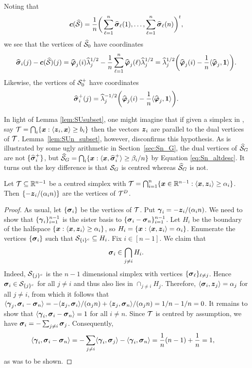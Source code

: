 Noting that 
\begin{equation*}
\vb*{c}(\widehat{\mathcal{S}}) = \frac{1}{n}\bigg(\sum_{\ell=1}^n \widehat{\vb*{\sigma}}_\ell(1),\dots,\sum_{\ell=1}^n \widehat{\vb*{\sigma}}_\ell(n)\bigg)^t,
\end{equation*}
we see that the vertices of $\widehat{\mathcal{S}}_0$ have coordinates
\begin{equation*}
\widehat{\vb*{\sigma}}_i(j) - \vb*{c}(\widehat{\mathcal{S}})(j) = \widehat{\vb*{\varphi}}_j(i)\widehat{\lambda}_j^{1/2} - \frac{1}{n}\sum_{\ell=1}^n \widehat{\vb*{\varphi}}_j(\ell)\widehat{\lambda}_j^{1/2} = \widehat{\lambda}_j^{1/2} \bigg(\widehat{\vb*{\varphi}}_j(i) - \frac{1}{n}\langle \widehat{\vb*{\varphi}}_j,\vb{1}\rangle \bigg).
\end{equation*}
Likewise, the vertices of $\mathcal{S}_0^+$ have coordinates 
\begin{equation*}
\widehat{\vb*{\sigma}}_i^+(j) = \widehat{\lambda}_j^{-1/2}\bigg(\widehat{\vb*{\varphi}}_j(i) - \frac{1}{n}\langle \widehat{\vb*{\varphi}}_j,\vb{1}\rangle\bigg).
\end{equation*}


In light of Lemma \ref{lem:SUsubset}, one might imagine that if given a simplex in \hdesc, say $\mathcal{T}=\bigcap_i \{\vb*{x}:\langle \vb*{z}_i,\vb*{x}\rangle \geq b_i\}$ then the vectors $\vb*{z}_i$ are parallel to the dual vertices of $\mathcal{T}$. Lemma~\ref{lem:SUn_subset}, however, disconfirms this hypothesis. As is illustrated by some ugly arithmetic in Section~\ref{sec:Sn_G}, the dual vertices of $\widehat{\mathcal{S}}_G$ are not $\{\widehat{\vb*{\sigma}}_i^+\}$, but $\widehat{\mathcal{S}}_G = \bigcap_i \{\vb*{x}:\langle \vb*{x},\widehat{\vb*{\sigma}}_i^+\rangle \geq \beta_i/n\}$ by Equation \eqref{eq:Sn_altdesc}. It turns out the key difference is that $\mathcal{S}_G$ is centred whereas $\widehat{\mathcal{S}}_G$ is not. 

\begin{lemma}
	\label{lem:hdesc_dual}
	Let $\mathcal{T}\subseteq\mathbb{R}^{n-1}$ be a centred simplex with $\mathcal{T}=\bigcap_{i=1}^n  \{\vb*{x}\in\mathbb{R}^{n-1}: \langle \vb*{x},\vb*{z}_i\rangle \geq  \alpha_i\}$. Then $\{-\vb*{z}_i/(\alpha_i n)\}$ are the vertices of $\mathcal{T}^D$. 
\end{lemma}
\begin{proof}
	As usual, let $\{\vb*{\sigma}_i\}$ be the vertices of $\mathcal{T}$. Put $\vb*{\gamma}_i = -\vb*{z}_i/(\alpha_i n)$. We need to show that $\{\vb*{\gamma}_i\}_{i=1}^{n-1}$ is the sister basis to $\{\vb*{\sigma}_i-\vb*{\sigma}_n\}_{i=1}^{n-1}$. Let $H_i$ be the boundary of the halfspace $\{\vb*{x}:\langle \vb*{x},\vb*{z}_i\rangle \geq \alpha_i\}$, so $H_i = \{\vb*{x}:\langle \vb*{x},\vb*{z}_i\rangle = \alpha_i\}$. Enumerate the vertices $\{\vb*{\sigma}_i\}$ such that $\mathcal{S}_{\{i\}^c} \subseteq H_i$. Fix $i\in[n-1]$. We claim that 
	\[\vb*{\sigma}_i \in \bigcap_{j\neq i}H_i.\]
	Indeed, $\mathcal{S}_{\{j\}^c}$ is the $n-1$ dimensional simplex with vertices $\{\vb*{\sigma}_\ell\}_{\ell\neq j}$. Hence $\vb*{\sigma}_i\in \mathcal{S}_{\{j\}^c}$ for all $j\neq i$ and thus also lies in $\cap_{j \neq i}H_j$. Therefore, $\langle \vb*{\sigma}_i,\vb*{z}_j\rangle = \alpha_j$ for all $j\neq i$, from which it follows  that $\langle \vb*{\gamma}_j,\vb*{\sigma}_i-\vb*{\sigma}_n\rangle = -\langle \vb*{z}_j,\vb*{\sigma}_i\rangle/(\alpha_j n) + \langle \vb*{z}_j,\vb*{\sigma}_n\rangle / (\alpha_j n )=1/n - 1/n =0$.  
	It remains to show that $\langle \vb*{\gamma}_i,\vb*{\sigma}_i-\vb*{\sigma}_n\rangle=1$ for all $i\neq n$. Since $\mathcal{T}$ is centred by assumption, we have $\vb*{\sigma}_i = -\sum_{j\neq i} \vb*{\sigma}_j$. Consequently, 
	\begin{align*}
	\langle \vb*{\gamma}_i,\vb*{\sigma}_i-\vb*{\sigma}_n\rangle &= -\sum_{j\neq i}\langle \vb*{\gamma}_i,\vb*{\sigma}_j\rangle - \langle \vb*{\gamma}_i,\vb*{\sigma}_n \rangle = \frac{1}{n}(n-1) + \frac{1}{n} = 1,
	\end{align*}
	as was to be shown.  
\end{proof}

